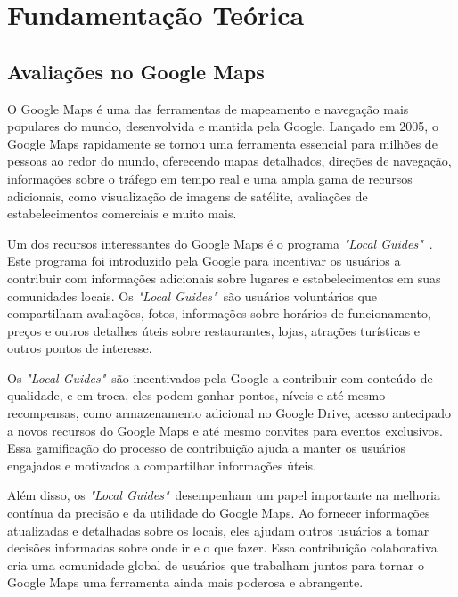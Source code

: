 \chapter{Fundamentação Teórica}
\label{cap:fund_teorica}


\section{Avaliações no Google Maps}
\label{cap:fund_teorica:sec:google_maps}

O Google Maps  é uma das ferramentas de mapeamento e navegação mais populares do mundo, desenvolvida e mantida pela Google. Lançado em 2005, o Google Maps rapidamente se tornou uma ferramenta essencial para milhões de pessoas ao redor do mundo, oferecendo mapas detalhados, direções de navegação, informações sobre o tráfego em tempo real e uma ampla gama de recursos adicionais, como visualização de imagens de satélite, avaliações de estabelecimentos comerciais e muito mais.

Um dos recursos interessantes do Google Maps é o programa \emph{"Local Guides"}~. Este programa foi introduzido pela Google para incentivar os usuários a contribuir com informações adicionais sobre lugares e estabelecimentos em suas comunidades locais. Os \emph{"Local Guides"}~são usuários voluntários que compartilham avaliações, fotos, informações sobre horários de funcionamento, preços e outros detalhes úteis sobre restaurantes, lojas, atrações turísticas e outros pontos de interesse.

Os \emph{"Local Guides"}~são incentivados pela Google a contribuir com conteúdo de qualidade, e em troca, eles podem ganhar pontos, níveis e até mesmo recompensas, como armazenamento adicional no Google Drive, acesso antecipado a novos recursos do Google Maps e até mesmo convites para eventos exclusivos. Essa gamificação do processo de contribuição ajuda a manter os usuários engajados e motivados a compartilhar informações úteis.

Além disso, os \emph{"Local Guides"}~desempenham um papel importante na melhoria contínua da precisão e da utilidade do Google Maps. Ao fornecer informações atualizadas e detalhadas sobre os locais, eles ajudam outros usuários a tomar decisões informadas sobre onde ir e o que fazer. Essa contribuição colaborativa cria uma comunidade global de usuários que trabalham juntos para tornar o Google Maps uma ferramenta ainda mais poderosa e abrangente.

